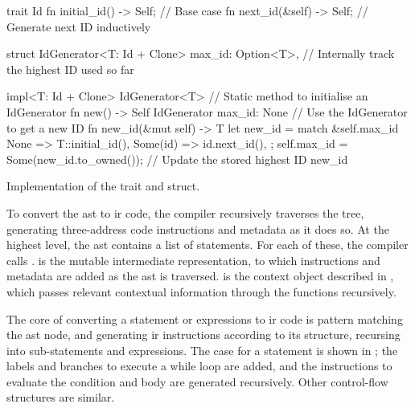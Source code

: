 \documentclass[00-main.tex]{subfiles}
\begin{document}
\begin{listing}[t]
  \begin{RustListing}
    trait Id {
        fn initial_id() -> Self;   // Base case
        fn next_id(&self) -> Self; // Generate next ID inductively
    }

    struct IdGenerator<T: Id + Clone> {
        max_id: Option<T>,         // Internally track the highest ID used so far
    }

    impl<T: Id + Clone> IdGenerator<T> {
        // Static method to initialise an IdGenerator
        fn new() -> Self {
            IdGenerator { max_id: None }
        }
        // Use the IdGenerator to get a new ID
        fn new_id(&mut self) -> T {
            let new_id = match &self.max_id {
                None => T::initial_id(),
                Some(id) => id.next_id(),
            };
            self.max_id = Some(new_id.to_owned()); // Update the stored highest ID
            new_id
        }
    }
  \end{RustListing}
  \caption{Implementation of the  trait and  struct.}
  \label{lst:Id and IdGenerator implementation}
\end{listing}


To convert the \gls{ast} to \gls{ir} code, the compiler recursively traverses the tree, generating three-address code instructions and metadata as it does so.
At the highest level, the \gls{ast} contains a list of statements.
For each of these, the compiler calls . %
 is the mutable intermediate representation, to which instructions and metadata are added as the \gls{ast} is traversed.
 is the context object described in , which passes relevant contextual information through the functions recursively.

The core of converting a statement or expressions to \gls{ir} code is pattern matching the \gls{ast} node, and generating \gls{ir} instructions according to its structure, recursing into sub-statements and expressions.
The case for a  statement is shown in ; the labels and branches to execute a while loop are added, and the instructions to evaluate the condition and body are generated recursively.
Other control-flow structures are similar.
\end{document}
